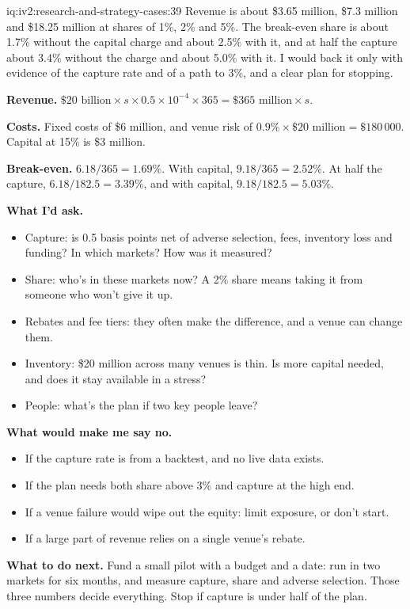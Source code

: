 \begin{solution}{iq:iv2:research-and-strategy-cases:39}
Revenue is about \$3.65 million, \$7.3 million and \$18.25 million at shares of 1\%, 2\% and 5\%. The break-even share is about 1.7\% without the capital charge and about 2.5\% with it, and at half the capture about 3.4\% without the charge and about 5.0\% with it. I would back it only with evidence of the capture rate and of a path to 3\%, and a clear plan for stopping.

\textbf{Revenue.} $\$20 \text{ billion} \times s \times 0.5 \times 10^{-4} \times 365 = \$365 \text{ million} \times s$.

\textbf{Costs.} Fixed costs of \$6 million, and venue risk of $0.9\% \times \$20 \text{ million} = \$180\,000$. Capital at 15\% is \$3 million.

\textbf{Break-even.} $6.18/365 = 1.69\%$. With capital, $9.18/365 = 2.52\%$. At half the capture, $6.18/182.5 = 3.39\%$, and with capital, $9.18/182.5 = 5.03\%$.

\textbf{What I'd ask.}
\begin{itemize}
\item Capture: is 0.5 basis points net of adverse selection, fees, inventory loss and funding? In which markets? How was it measured?
\item Share: who's in these markets now? A 2\% share means taking it from someone who won't give it up.
\item Rebates and fee tiers: they often make the difference, and a venue can change them.
\item Inventory: \$20 million across many venues is thin. Is more capital needed, and does it stay available in a stress?
\item People: what's the plan if two key people leave?
\end{itemize}

\textbf{What would make me say no.}
\begin{itemize}
\item If the capture rate is from a backtest, and no live data exists.
\item If the plan needs both share above 3\% and capture at the high end.
\item If a venue failure would wipe out the equity: limit exposure, or don't start.
\item If a large part of revenue relies on a single venue's rebate.
\end{itemize}

\textbf{What to do next.} Fund a small pilot with a budget and a date: run in two markets for six months, and measure capture, share and adverse selection. Those three numbers decide everything. Stop if capture is under half of the plan.

\end{solution}

